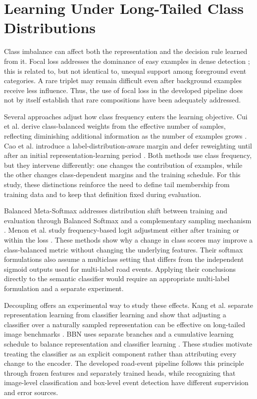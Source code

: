 \section{Learning Under Long-Tailed Class Distributions}

Class imbalance can affect both the representation and the decision rule learned from it. Focal loss addresses the dominance of easy examples in dense detection \cite{focal-loss}; this is related to, but not identical to, unequal support among foreground event categories. A rare triplet may remain difficult even after background examples receive less influence. Thus, the use of focal loss in the developed pipeline does not by itself establish that rare compositions have been adequately addressed.

Several approaches adjust how class frequency enters the learning objective. Cui et al. derive class-balanced weights from the effective number of samples, reflecting diminishing additional information as the number of examples grows \cite{class-balanced}. Cao et al. introduce a label-distribution-aware margin and defer reweighting until after an initial representation-learning period \cite{ldam}. Both methods use class frequency, but they intervene differently: one changes the contribution of examples, while the other changes class-dependent margins and the training schedule. For this study, these distinctions reinforce the need to define tail membership from training data and to keep that definition fixed during evaluation.

Balanced Meta-Softmax addresses distribution shift between training and evaluation through Balanced Softmax and a complementary sampling mechanism \cite{balanced-softmax}. Menon et al. study frequency-based logit adjustment either after training or within the loss \cite{logit-adjust}. These methods show why a change in class scores may improve a class-balanced metric without changing the underlying features. Their softmax formulations also assume a multiclass setting that differs from the independent sigmoid outputs used for multi-label road events. Applying their conclusions directly to the semantic classifier would require an appropriate multi-label formulation and a separate experiment.

Decoupling offers an experimental way to study these effects. Kang et al. separate representation learning from classifier learning and show that adjusting a classifier over a naturally sampled representation can be effective on long-tailed image benchmarks \cite{decoupling}. BBN uses separate branches and a cumulative learning schedule to balance representation and classifier learning \cite{bbn}. These studies motivate treating the classifier as an explicit component rather than attributing every change to the encoder. The developed road-event pipeline follows this principle through frozen features and separately trained heads, while recognizing that image-level classification and box-level event detection have different supervision and error sources.

